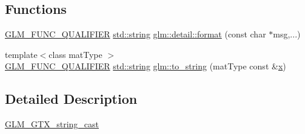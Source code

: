 \subsection*{Functions}
\begin{DoxyCompactItemize}
\item 
\hyperlink{setup_8hpp_a33fdea6f91c5f834105f7415e2a64407}{G\+L\+M\+\_\+\+F\+U\+N\+C\+\_\+\+Q\+U\+A\+L\+I\+F\+I\+ER} \hyperlink{_s_d_l__opengl__glext_8h_ae84541b4f3d8e1ea24ec0f466a8c568b}{std\+::string} \hyperlink{namespaceglm_1_1detail_acd5305bbd1c5417b1eb770faf8229d14}{glm\+::detail\+::format} (const char $\ast$msg,...)
\item 
{\footnotesize template$<$class mat\+Type $>$ }\\\hyperlink{setup_8hpp_a33fdea6f91c5f834105f7415e2a64407}{G\+L\+M\+\_\+\+F\+U\+N\+C\+\_\+\+Q\+U\+A\+L\+I\+F\+I\+ER} \hyperlink{_s_d_l__opengl__glext_8h_ae84541b4f3d8e1ea24ec0f466a8c568b}{std\+::string} \hyperlink{namespaceglm_a8e7a49fe8e0b47b1ffe98cc215142c8e}{glm\+::to\+\_\+string} (mat\+Type const \&\hyperlink{_s_d_l__opengl_8h_ad0e63d0edcdbd3d79554076bf309fd47}{x})
\end{DoxyCompactItemize}


\subsection{Detailed Description}
\hyperlink{group__gtx__string__cast}{G\+L\+M\+\_\+\+G\+T\+X\+\_\+string\+\_\+cast} 
